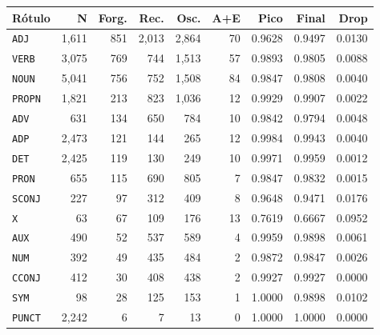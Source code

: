 \begin{table}[ht]
\hfill
\begin{minipage}[t]{0.42\linewidth}
\centering\tiny
\begin{tabular}{lrrrrrrrr}
\toprule
\textbf{Rótulo} & \textbf{N} & \textbf{Forg.} & \textbf{Rec.} & \textbf{Osc.} & \textbf{A+E} & \textbf{Pico} & \textbf{Final} & \textbf{Drop} \\
\midrule
\texttt{ADJ} & 1,611 & 851 & 2,013 & 2,864 & 70 & 0.9628 & 0.9497 & 0.0130 \\
\texttt{VERB} & 3,075 & 769 & 744 & 1,513 & 57 & 0.9893 & 0.9805 & 0.0088 \\
\texttt{NOUN} & 5,041 & 756 & 752 & 1,508 & 84 & 0.9847 & 0.9808 & 0.0040 \\
\texttt{PROPN} & 1,821 & 213 & 823 & 1,036 & 12 & 0.9929 & 0.9907 & 0.0022 \\
\texttt{ADV} & 631 & 134 & 650 & 784 & 10 & 0.9842 & 0.9794 & 0.0048 \\
\texttt{ADP} & 2,473 & 121 & 144 & 265 & 12 & 0.9984 & 0.9943 & 0.0040 \\
\texttt{DET} & 2,425 & 119 & 130 & 249 & 10 & 0.9971 & 0.9959 & 0.0012 \\
\texttt{PRON} & 655 & 115 & 690 & 805 & 7 & 0.9847 & 0.9832 & 0.0015 \\
\texttt{SCONJ} & 227 & 97 & 312 & 409 & 8 & 0.9648 & 0.9471 & 0.0176 \\
\texttt{X} & 63 & 67 & 109 & 176 & 13 & 0.7619 & 0.6667 & 0.0952 \\
\texttt{AUX} & 490 & 52 & 537 & 589 & 4 & 0.9959 & 0.9898 & 0.0061 \\
\texttt{NUM} & 392 & 49 & 435 & 484 & 2 & 0.9872 & 0.9847 & 0.0026 \\
\texttt{CCONJ} & 412 & 30 & 408 & 438 & 2 & 0.9927 & 0.9927 & 0.0000 \\
\texttt{SYM} & 98 & 28 & 125 & 153 & 1 & 1.0000 & 0.9898 & 0.0102 \\
\texttt{PUNCT} & 2,242 & 6 & 7 & 13 & 0 & 1.0000 & 1.0000 & 0.0000 \\
\bottomrule
\end{tabular}
\end{minipage}
\end{table}



